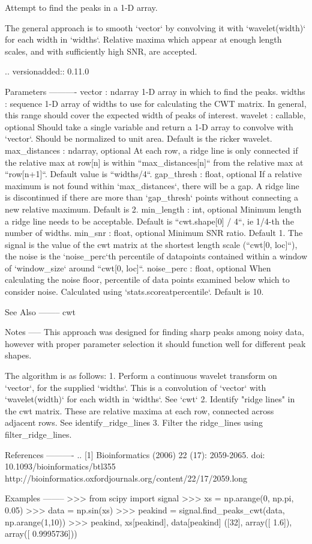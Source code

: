 \begin{DoxyVerb}Attempt to find the peaks in a 1-D array.

The general approach is to smooth `vector` by convolving it with
`wavelet(width)` for each width in `widths`. Relative maxima which
appear at enough length scales, and with sufficiently high SNR, are
accepted.

.. versionadded:: 0.11.0

Parameters
----------
vector : ndarray
    1-D array in which to find the peaks.
widths : sequence
    1-D array of widths to use for calculating the CWT matrix. In general,
    this range should cover the expected width of peaks of interest.
wavelet : callable, optional
    Should take a single variable and return a 1-D array to convolve
    with `vector`.  Should be normalized to unit area.
    Default is the ricker wavelet.
max_distances : ndarray, optional
    At each row, a ridge line is only connected if the relative max at
    row[n] is within ``max_distances[n]`` from the relative max at
    ``row[n+1]``.  Default value is ``widths/4``.
gap_thresh : float, optional
    If a relative maximum is not found within `max_distances`,
    there will be a gap. A ridge line is discontinued if there are more
    than `gap_thresh` points without connecting a new relative maximum.
    Default is 2.
min_length : int, optional
    Minimum length a ridge line needs to be acceptable.
    Default is ``cwt.shape[0] / 4``, ie 1/4-th the number of widths.
min_snr : float, optional
    Minimum SNR ratio. Default 1. The signal is the value of
    the cwt matrix at the shortest length scale (``cwt[0, loc]``), the
    noise is the `noise_perc`th percentile of datapoints contained within a
    window of `window_size` around ``cwt[0, loc]``.
noise_perc : float, optional
    When calculating the noise floor, percentile of data points
    examined below which to consider noise. Calculated using
    `stats.scoreatpercentile`.  Default is 10.

See Also
--------
cwt

Notes
-----
This approach was designed for finding sharp peaks among noisy data,
however with proper parameter selection it should function well for
different peak shapes.

The algorithm is as follows:
 1. Perform a continuous wavelet transform on `vector`, for the supplied
    `widths`. This is a convolution of `vector` with `wavelet(width)` for
    each width in `widths`. See `cwt`
 2. Identify "ridge lines" in the cwt matrix. These are relative maxima
    at each row, connected across adjacent rows. See identify_ridge_lines
 3. Filter the ridge_lines using filter_ridge_lines.

References
----------
.. [1] Bioinformatics (2006) 22 (17): 2059-2065.
    doi: 10.1093/bioinformatics/btl355
    http://bioinformatics.oxfordjournals.org/content/22/17/2059.long

Examples
--------
>>> from scipy import signal
>>> xs = np.arange(0, np.pi, 0.05)
>>> data = np.sin(xs)
>>> peakind = signal.find_peaks_cwt(data, np.arange(1,10))
>>> peakind, xs[peakind], data[peakind]
([32], array([ 1.6]), array([ 0.9995736]))\end{DoxyVerb}
 
